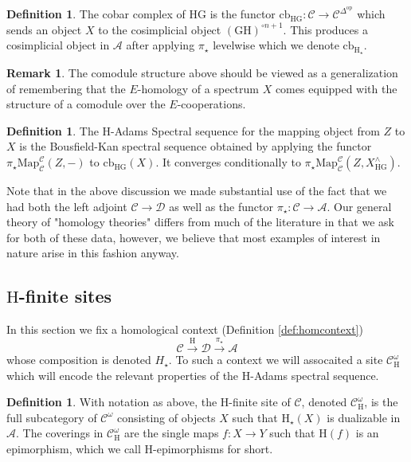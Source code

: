 \documentclass[10pt]{amsart}
\theoremstyle{definition}
\numberwithin{figure}{section}
\numberwithin{equation}{section}
\newtheorem{definition}[figure]{Definition}
\newtheorem{remark}[figure]{Remark}
\newcommand{\op}{\mathrm{op}}
\newcommand{\cA}{\mathcal{A}}
\newcommand{\cC}{\mathcal{C}}
\newcommand{\cD}{\mathcal{D}}
\theoremstyle{cited}
\newcommand{\Map}{\mathrm{Map}}
\newcommand{\cb}{\mathrm{cb}}
\renewcommand{\H}{\mathrm{H}}
\newcommand{\G}{\mathrm{G}}
\begin{document}
\begin{definition}
  The cobar complex of $\H\G$ is the functor $\cb_{\H\G}:\cC\to \cC^{\Delta^\op}$ which sends an object $X$ to the cosimplicial object $(\G\H)^{\circ n+1}$. This produces a cosimplicial object in $\cA$ after applying $\pi_\star$ levelwise which we denote $\cb_{\H_\star}$.
\end{definition}

\begin{remark}
  The comodule structure above should be viewed as a generalization of remembering that the $E$-homology of a spectrum $X$ comes equipped with the structure of a comodule over the $E$-cooperations.
\end{remark}

\begin{definition}
  The $\H$-Adams Spectral sequence for the mapping object from $Z$ to $X$ is the Bousfield-Kan spectral sequence obtained by applying the functor $\pi_\star\Map_{\cC}^{\cC}(Z, -)$ to $\cb_{\H\G}(X)$. It converges conditionally to $\pi_\star\Map_{\cC}^{\cC}(Z,X^\wedge_{\H\G})$.
\end{definition}

Note that in the above discussion we made substantial use of the fact that we had both the left adjoint $\cC\to \cD$ as well as the functor $\pi_\star:\cC\to \cA$. Our general theory of "homology theories" differs from much of the literature in that we ask for both of these data, however, we believe that most examples of interest in nature arise in this fashion anyway.

\subsection{$\H$-finite sites}

In this section we fix a homological context (Definition \ref{def:homcontext})
\[
\cC\xrightarrow{\H} \cD \xrightarrow{\pi_\star} \cA
\]
whose composition is denoted $H_\star$. To such a context we will assocaited a site $\cC_{\H}^\omega$ which will encode the relevant properties of the $\H$-Adams spectral sequence.

\begin{definition}
  With notation as above, the $\H$-finite site of $\cC$, denoted $\cC^{\omega}_{\H}$, is the full subcategory of $\cC^\omega$ consisting of objects $X$ such that $\H_{\star}(X)$ is dualizable in $\cA$. The coverings in $\cC^\omega_{\H}$ are the single maps $f:X\to Y$ such that $\H(f)$ is an epimorphism, which we call $\H$-epimorphisms for short.
\end{definition}
\end{document}
